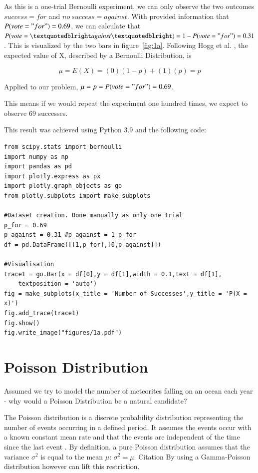As this is a one-trial Bernoulli experiment, we can only observe the two outcomes $success = for$ and $no~success = against$. With provided information that $P(vote = "for") = 0.69$, we can calculate that $P(vote=”against”) = 1 - P(vote = "for") = 0.31$. This is visualized by the two bars in figure~\ref{fig:1a}. Following Hogg et al. \cite[Chapter~3.1]{hogg}, the expected value of X, described by a Bernoulli Distribution, is 

\begin{equation}  \mu = E(X) = (0)(1-p) + (1)(p) = p
\label{eq:expvaluebernoulli}\end{equation}

Applied to our problem,  $ \mu = p = P(vote = "for") = 0.69 $.

This means if we would repeat the experiment one hundred times, we expect to observe 69 successes. 


This result was achieved using Python 3.9 and the following code:

\begin{lstlisting}
from scipy.stats import bernoulli
import numpy as np
import pandas as pd
import plotly.express as px
import plotly.graph_objects as go
from plotly.subplots import make_subplots

#Dataset creation. Done manually as only one trial
p_for = 0.69
p_against = 0.31 #p_against = 1-p_for
df = pd.DataFrame([[1,p_for],[0,p_against]])

#Visualisation
trace1 = go.Bar(x = df[0],y = df[1],width = 0.1,text = df[1], 
    textposition = 'auto')
fig = make_subplots(x_title = 'Number of Successes',y_title = 'P(X = x)')
fig.add_trace(trace1)
fig.show()
fig.write_image("figures/1a.pdf")
\end{lstlisting}

\section{Poisson Distribution}

Assumed we try to model the number of meteorites falling on an ocean each year - why would a Poisson Distribution be a natural candidate?


The Poisson distribution is a discrete probability distribution representing the number of events occurring in a defined period. It assumes the events occur with a known constant mean rate and that the events are independent of the time since the last event \cite[Chapter~4.6]{illowsky2018introductory}. By definition, a pure Poisson distribution assumes that the variance $\sigma^2$ is equal to the mean $\mu$: $\sigma^2 = \mu$. Citation By using a Gamma-Poisson distribution however can lift this restriction. 

